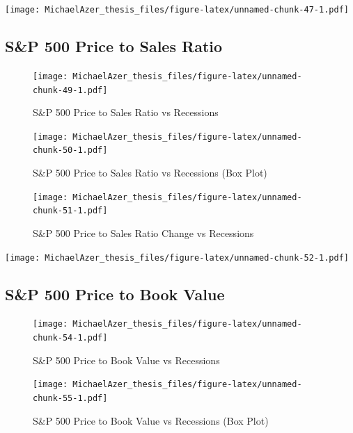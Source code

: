 \documentclass[]{book}
\begin{document}
\texttt{[image: MichaelAzer\_thesis\_files/figure-latex/unnamed-chunk-47-1.pdf]}

\hypertarget{sp-500-price-to-sales-ratio}{%
\subsection{S\&P 500 Price to Sales Ratio}\label{sp-500-price-to-sales-ratio}}

\begin{figure}
\centering
\texttt{[image: MichaelAzer\_thesis\_files/figure-latex/unnamed-chunk-49-1.pdf]}
\caption{\label{fig:unnamed-chunk-49}\label{fig:figs}S\&P 500 Price to Sales Ratio vs Recessions}
\end{figure}

\begin{figure}
\centering
\texttt{[image: MichaelAzer\_thesis\_files/figure-latex/unnamed-chunk-50-1.pdf]}
\caption{\label{fig:unnamed-chunk-50}\label{fig:figs}S\&P 500 Price to Sales Ratio vs Recessions (Box Plot)}
\end{figure}

\begin{figure}
\centering
\texttt{[image: MichaelAzer\_thesis\_files/figure-latex/unnamed-chunk-51-1.pdf]}
\caption{\label{fig:unnamed-chunk-51}\label{fig:figs}S\&P 500 Price to Sales Ratio Change vs Recessions}
\end{figure}

\texttt{[image: MichaelAzer\_thesis\_files/figure-latex/unnamed-chunk-52-1.pdf]}

\hypertarget{sp-500-price-to-book-value}{%
\subsection{S\&P 500 Price to Book Value}\label{sp-500-price-to-book-value}}

\begin{figure}
\centering
\texttt{[image: MichaelAzer\_thesis\_files/figure-latex/unnamed-chunk-54-1.pdf]}
\caption{\label{fig:unnamed-chunk-54}\label{fig:figs}S\&P 500 Price to Book Value vs Recessions}
\end{figure}

\begin{figure}
\centering
\texttt{[image: MichaelAzer\_thesis\_files/figure-latex/unnamed-chunk-55-1.pdf]}
\caption{\label{fig:unnamed-chunk-55}\label{fig:figs}S\&P 500 Price to Book Value vs Recessions (Box Plot)}
\end{figure}
\end{document}
